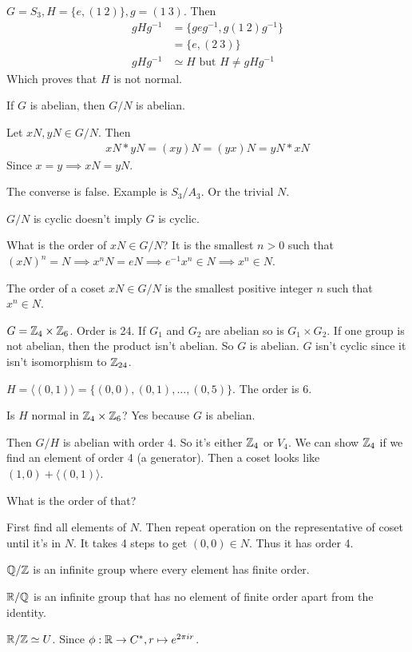 \documentclass[class=article,crop=false]{standalone}
\begin{document}
\begin{eg}[]
	$ G=S_3, H=\{e, (1\ 2)\}, g=(1\ 3) $. Then
\begin{align*}
	gHg^{-1} &= \{geg^{-1}, g(1\ 2)g^{-1}\}\\
		 &= \{e, (2\ 3)\}  \\
	gHg^{-1} &\simeq H \text{ but } H \neq gHg^{-1} 
\end{align*}
Which proves that $ H$ is not normal.
\end{eg}

\begin{thm}[]
If $ G$ is abelian, then  $ G / N$ is abelian.
\end{thm}
\begin{prf}
Let $ xN,yN \in G / N$. Then
\begin{align*}
	xN*yN= (xy) N = (yx) N = yN*xN
\end{align*}
Since $ x=y \implies xN = yN$.
\end{prf}
\begin{note}[]
The converse is false. Example is $ S_3 / A_3$. Or the trivial $ N$.  
\end{note}
\begin{note}[]
$ G / N$ is cyclic doesn't imply $ G$ is cyclic.
\end{note}

What is the order of $ xN \in G / N$? It is the smallest $ n>0$  such that $ (xN)^{n}=N \implies x^{n} N= eN \implies e^{-1}x^{n} \in N \implies x^{n} \in N$.

\begin{defn}[]
The order of a coset $ xN \in G / N$ is the smallest positive integer $ n$  such that $ x^{n} \in N$. 
\end{defn}

\begin{eg}[15.7]
$ G= \mathbb{Z}_4 \times \mathbb{Z}_6$. Order is 24. If $ G_1$ and $ G_2$ are abelian so is $ G_1 \times G_2$. If one group is not abelian, then the product isn't abelian. So $ G$ is abelian. $ G$ isn't cyclic since it isn't isomorphism to $ \mathbb{Z}_{24}$. 

$ H=\langle (0,1) \rangle = \{(0,0), (0,1),\ldots,(0,5)\} $. The order is 6. 

Is $ H$ normal in  $ \mathbb{Z}_4 \times \mathbb{Z}_6$? Yes because $ G$ is abelian.

Then  $ G / H$ is abelian with order 4. So it's either $ \mathbb{Z}_4$ or $ V_4$. We can show $ \mathbb{Z}_4$ if we find an element of order 4 (a generator). Then a coset looks like  $ (1,0)+ \langle (0,1) \rangle$. 

What is the order of that? 

First find all elements of $ N$. Then repeat operation on the representative of coset until it's in  $ N$.  It takes 4 steps to get $ (0,0) \in N$. Thus it has order 4.
\end{eg}
\begin{eg}[]
	$ \mathbb{Q} / \mathbb{Z}$ is an infinite group where every element has finite order.

	$ \mathbb{R} / \mathbb{Q}$ is an infinite group that has no element of finite order apart from the identity.

	$ \mathbb{R} / \mathbb{Z} \simeq U$. Since $ \phi: \mathbb{R} \to C^*, r\mapsto e^{2\pi i r} $.
\end{eg}
\end{document}
